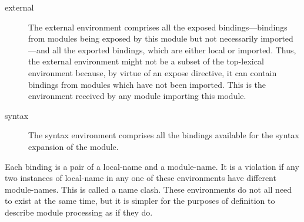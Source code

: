 \begin{optDefinition}
\begin{description}
    \item[external] The external environment comprises all the exposed
    bindings---bindings from modules being exposed by this module but not
    necessarily imported---and all the exported bindings, which are either local
    or imported.  Thus, the external environment might not be a subset of the
    top-lexical environment because, by virtue of an expose directive, it can
    contain bindings from modules which have not been imported.  This is the
    environment received by any module importing this module.

    \item[syntax] The syntax environment comprises all the bindings available
    for the syntax expansion of the module.
\end{description}
%
Each binding is a pair of a local-name and a module-name.  It is a violation
if any two instances of local-name in any one of these environments have
different module-names.  This is called a name clash.  These environments do not
all need to exist at the same time, but it is simpler for the purposes of
definition to describe module processing as if they do.
\end{optDefinition}
%
\label{defmodule}
%
